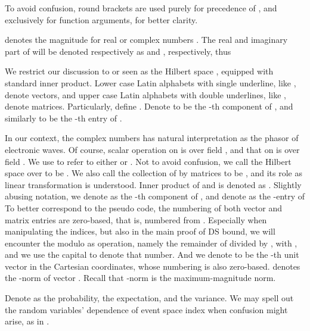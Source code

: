 \starttitle [title={Notation}]

To avoid confusion, round brackets \m {\RB {\cdot}} are used purely for precedence of , and \m {\SB {\cdot}} exclusively for function arguments, for better clarity.

 denotes the magnitude for real or complex numbers .
The real and imaginary part of  will be denoted respectively as  and , respectively, thus 

We restrict our discussion to  or  seen as the Hilbert space , equipped with standard inner product.
Lower case Latin alphabets with single underline, like , denote vectors, and upper case Latin alphabets with double underlines, like , denote matrices.
Particularly, define .
Denote  to be the -th component of , and similarly  to be the -th entry of .

In our context, the complex numbers has natural interpretation as the phasor of electronic waves.
Of course, scalar operation on  is over field , and that on  is over field .
We use  to refer to either  or .
Not to avoid confusion, we call the Hilbert space  over  to be .
We also call the collection of  by  matrices to be , and its role as linear transformation is understood.
Inner product of  and  is denoted as .
Slightly abusing notation, we denote as  the -th component of , and denote as  the -entry of 
To better correspond to the pseudo code, the numbering of both vector and matrix entries are zero-based, that is, numbered from .
Especially when manipulating the indices, but also in the main proof of DS bound, we will encounter the modulo as operation, namely the remainder of  divided by , with , and we use the capital  to denote that number.
And we denote  to be the -th unit vector in the Cartesian coordinates, whose numbering is also zero-based.
 denotes the -norm of vector .
Recall that \m {\ell_\infty}-norm is the maximum-magnitude norm.

Denote as  the probability,  the expectation, and  the variance.
We may spell out the random variables' dependence of event space index when confusion might arise, as in .

\stopchapter
